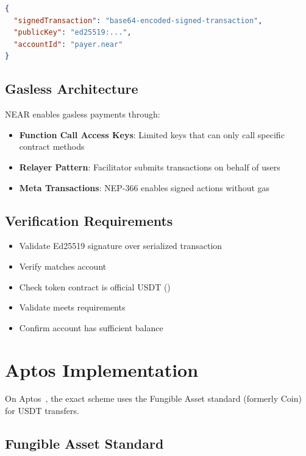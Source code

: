 \begin{lstlisting}[language=json,caption={NEAR exact scheme payload}]
{
  "signedTransaction": "base64-encoded-signed-transaction",
  "publicKey": "ed25519:...",
  "accountId": "payer.near"
}
\end{lstlisting}

\subsection{Gasless Architecture}

NEAR enables gasless payments through:

\begin{itemize}
    \item \textbf{Function Call Access Keys}: Limited keys that can only call specific contract methods
    \item \textbf{Relayer Pattern}: Facilitator submits transactions on behalf of users
    \item \textbf{Meta Transactions}: NEP-366 enables signed actions without gas
\end{itemize}

\subsection{Verification Requirements}

\begin{itemize}
    \item Validate Ed25519 signature over serialized transaction
    \item Verify  matches  account
    \item Check token contract is official USDT ()
    \item Validate  meets requirements
    \item Confirm account has sufficient balance
\end{itemize}

\section{Aptos Implementation}
\label{sec:aptos-implementation}

On Aptos~\cite{aptos}, the exact scheme uses the Fungible Asset standard (formerly Coin) for USDT transfers.

\subsection{Fungible Asset Standard}

